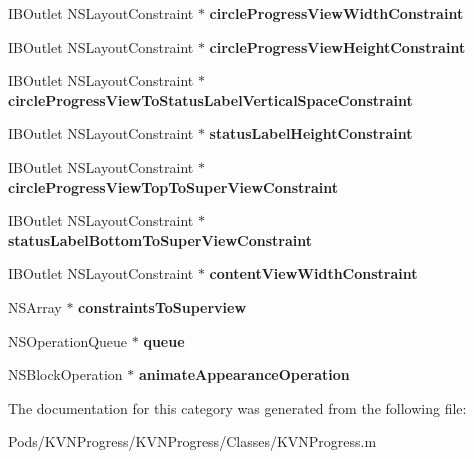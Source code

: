 \begin{DoxyCompactItemize}
\item 
\mbox{\label{category_k_v_n_progress_07_08_a529bee3502ffcb60a02e3fdd4b2b9780}} 
I\+B\+Outlet N\+S\+Layout\+Constraint $\ast$ {\bfseries circle\+Progress\+View\+Width\+Constraint}
\item 
\mbox{\label{category_k_v_n_progress_07_08_ae7773f9578b90216cb68710c61bed891}} 
I\+B\+Outlet N\+S\+Layout\+Constraint $\ast$ {\bfseries circle\+Progress\+View\+Height\+Constraint}
\item 
\mbox{\label{category_k_v_n_progress_07_08_a37121875865ef263604c2ae466a2507c}} 
I\+B\+Outlet N\+S\+Layout\+Constraint $\ast$ {\bfseries circle\+Progress\+View\+To\+Status\+Label\+Vertical\+Space\+Constraint}
\item 
\mbox{\label{category_k_v_n_progress_07_08_a43a06ee14f63a2337cbad800b9323c44}} 
I\+B\+Outlet N\+S\+Layout\+Constraint $\ast$ {\bfseries status\+Label\+Height\+Constraint}
\item 
\mbox{\label{category_k_v_n_progress_07_08_ad343d691521d0a9280590c1f3c020575}} 
I\+B\+Outlet N\+S\+Layout\+Constraint $\ast$ {\bfseries circle\+Progress\+View\+Top\+To\+Super\+View\+Constraint}
\item 
\mbox{\label{category_k_v_n_progress_07_08_a29659e818746c186324ed22855ba4ea8}} 
I\+B\+Outlet N\+S\+Layout\+Constraint $\ast$ {\bfseries status\+Label\+Bottom\+To\+Super\+View\+Constraint}
\item 
\mbox{\label{category_k_v_n_progress_07_08_a91edc7163b2797a67b8506a2114ec008}} 
I\+B\+Outlet N\+S\+Layout\+Constraint $\ast$ {\bfseries content\+View\+Width\+Constraint}
\item 
\mbox{\label{category_k_v_n_progress_07_08_ad2c7b2f7c8409c947cd8359dd06556ce}} 
N\+S\+Array $\ast$ {\bfseries constraints\+To\+Superview}
\item 
\mbox{\label{category_k_v_n_progress_07_08_a258afcfd19aa3fcccf2dfe1f5e9508ee}} 
N\+S\+Operation\+Queue $\ast$ {\bfseries queue}
\item 
\mbox{\label{category_k_v_n_progress_07_08_a55719da92aed8d90ca1b67d5d622ed51}} 
N\+S\+Block\+Operation $\ast$ {\bfseries animate\+Appearance\+Operation}
\end{DoxyCompactItemize}


The documentation for this category was generated from the following file\+:\begin{DoxyCompactItemize}
\item 
Pods/\+K\+V\+N\+Progress/\+K\+V\+N\+Progress/\+Classes/K\+V\+N\+Progress.\+m\end{DoxyCompactItemize}
